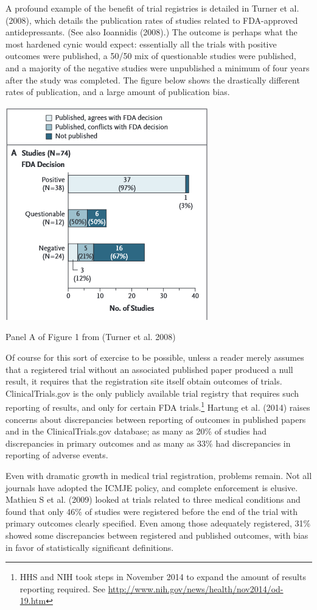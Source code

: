 \documentclass[12pt] {article}
\begin{document}
A profound example of the benefit of trial registries is detailed in
Turner et al. (2008), which details the publication rates of studies
related to FDA-approved antidepressants. (See also Ioannidis (2008).)
The outcome is perhaps what the most hardened cynic would expect:
essentially all the trials with positive outcomes were published, a
50/50 mix of questionable studies were published, and a majority of the
negative studies were unpublished a minimum of four years after the
study was completed. The figure below shows the drastically different
rates of publication, and a large amount of publication bias.
\begin{center}
\includegraphics{TurnerFigure1.PNG}

Panel A of Figure 1 from (Turner et al. 2008)
\end{center}
Of course for this sort of exercise to be possible, unless a reader
merely assumes that a registered trial without an associated published
paper produced a null result, it requires that the registration site
itself obtain outcomes of trials. ClinicalTrials.gov is the only
publicly available trial registry that requires such reporting of
results, and only for certain FDA trials.\footnote{HHS and NIH took steps in November 2014 to expand the amount of results reporting required. See \url{http://www.nih.gov/news/health/nov2014/od-19.htm}}  Hartung et al. (2014) raises
concerns about discrepancies between reporting of outcomes in published
papers and in the ClinicalTrials.gov database; as many as 20\% of
studies had discrepancies in primary outcomes and as many as 33\% had
discrepancies in reporting of adverse events.

Even with dramatic growth in medical trial registration, problems
remain. Not all journals have adopted the ICMJE policy, and complete
enforcement is elusive. Mathieu S et al. (2009) looked at trials related
to three medical conditions and found that only 46\% of studies were
registered before the end of the trial with primary outcomes clearly
specified. Even among those adequately registered, 31\% showed some
discrepancies between registered and published outcomes, with bias in
favor of statistically significant definitions.
\end{document}
